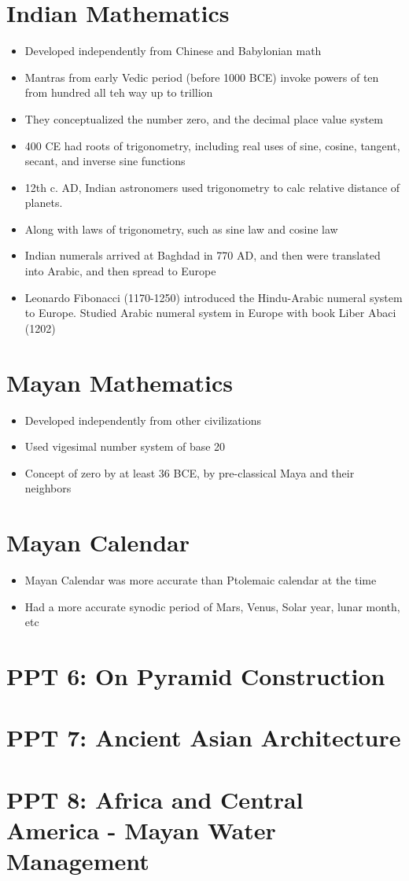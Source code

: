 \documentclass{article}
\begin{document}
\section*{Indian Mathematics}
\begin{itemize}
  \item Developed independently from Chinese and Babylonian math
  \item Mantras from early Vedic period (before 1000 BCE) invoke powers of ten
    from hundred all teh way up to trillion
  \item They conceptualized the number zero, and the decimal place value system
  \item 400 CE had roots of trigonometry, including real uses of
    sine, cosine, tangent, secant, and inverse sine functions
  \item 12th c. AD, Indian astronomers used trigonometry to calc relative distance of planets.
  \item Along with laws of trigonometry, such as sine law and cosine law
  \item Indian numerals arrived at Baghdad in 770 AD, and then
    were translated into Arabic, and then spread to Europe
  \item Leonardo Fibonacci (1170-1250) introduced the Hindu-Arabic numeral system to Europe.
    Studied Arabic numeral system in Europe with book Liber Abaci (1202)
\end{itemize}

\section*{Mayan Mathematics}
\begin{itemize}
  \item Developed independently from other civilizations
  \item Used vigesimal number system of base 20
  \item Concept of zero by at least 36 BCE,
    by pre-classical Maya and their neighbors
\end{itemize}

\section*{Mayan Calendar}
\begin{itemize}
  \item Mayan Calendar was more accurate than Ptolemaic calendar at the time
  \item Had a more accurate synodic period of Mars, Venus, Solar year, lunar month, etc
\end{itemize}

\section{PPT 6: On Pyramid Construction}

\section{PPT 7: Ancient Asian Architecture}

\section{PPT 8: Africa and Central America - Mayan Water Management}
\end{document}
